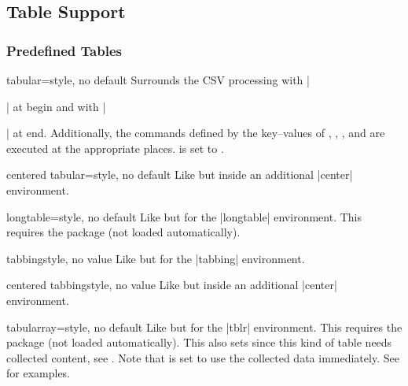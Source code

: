 \documentclass[a4paper,11pt]{ltxdoc}
\begin{document}
\clearpage
\subsection{Table Support}\label{subsec:tabsupport}%

\subsubsection{Predefined Tables}\label{subsubsec:table_predef}

\begin{docCsvKey}{tabular}{=}{style, no default}
  Surrounds the CSV processing with |\begin{tabular}|
  at begin and with |\end{tabular}| at end.
  Additionally, the commands defined by the key–values of
  , , ,
  and  are executed at the appropriate places.
   is set to \cs{}\cs{}.
\end{docCsvKey}


\begin{docCsvKey}{centered tabular}{=}{style, no default}
  Like  but inside an additional |center| environment.
\end{docCsvKey}


\begin{docCsvKey}{longtable}{=}{style, no default}
  Like  but for the |longtable| environment.
  This requires the package  (not loaded automatically).
\end{docCsvKey}


\begin{docCsvKey}{tabbing}{}{style, no value}
  Like  but for the |tabbing| environment.
\end{docCsvKey}


\begin{docCsvKey}{centered tabbing}{}{style, no value}
  Like  but inside an additional |center| environment.
\end{docCsvKey}


\begin{docCsvKey}[][doc new=2021-07-06]{tabularray}{=}{style, no default}
  Like  but for the |tblr| environment.
  This requires the package  (not loaded automatically).
  This also sets  since this kind of table
  needs collected content, see .
  Note that  is set to use the collected
  data immediately. See  for examples.
\end{docCsvKey}
\end{document}

